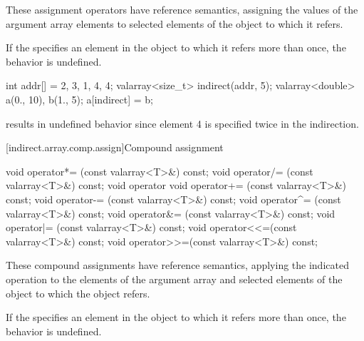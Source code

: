 \begin{itemdescr}
\pnum
These assignment operators have reference semantics, assigning the values
of the argument array elements to selected elements of the
object to which it refers.

\pnum
If the
specifies an element in the
object to which it refers more than once, the behavior is undefined.
%

\pnum
\begin{example}
\begin{codeblock}
int addr[] = {2, 3, 1, 4, 4};
valarray<size_t> indirect(addr, 5);
valarray<double> a(0., 10), b(1., 5);
a[indirect] = b;
\end{codeblock}
results in undefined behavior since element 4 is specified twice in the
indirection.
\end{example}
\end{itemdescr}

[indirect.array.comp.assign]{Compound assignment}

%
%
%
%
%
%
%
%
%
%
\begin{itemdecl}
void operator*= (const valarray<T>&) const;
void operator/= (const valarray<T>&) const;
void operator%
void operator+= (const valarray<T>&) const;
void operator-= (const valarray<T>&) const;
void operator^= (const valarray<T>&) const;
void operator&= (const valarray<T>&) const;
void operator|= (const valarray<T>&) const;
void operator<<=(const valarray<T>&) const;
void operator>>=(const valarray<T>&) const;
\end{itemdecl}

\begin{itemdescr}
\pnum
These compound assignments have reference semantics, applying the indicated
operation to the elements of the argument array and selected elements of the
object to which the
object refers.

\pnum
If the
specifies an element in the
object to which it refers more than once,
the behavior is undefined.
\end{itemdescr}

